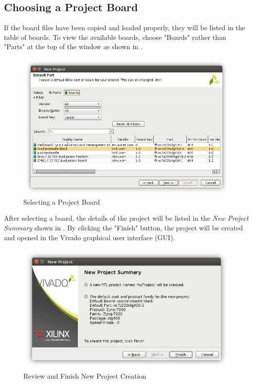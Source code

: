 \newpage

\subsection{Choosing a Project Board}
If the board files have been copied and loaded properly, they will be listed in the table of boards. To view the available boards, choose "Boards" rather than "Parts" at the top of the window as shown in . \\

\begin{figure}
	\centering
	\includegraphics{images/Project_Boards.png}
	\caption{Selecting a Project Board}
	\label{fig:vivadoprojectboard}
\end{figure}

\noindent
After selecting a board, the details of the project will be listed in the \textit{New Project Summary} shown in . By clicking the "Finish" button, the project will be created and opened in the Vivado graphical user interface (GUI). \\

\begin{figure}
	\centering
	\includegraphics{images/Finish_New_Project.png}
	\caption{Review and Finish New Project Creation}
	\label{fig:vivadoprojectfinish}
\end{figure}


